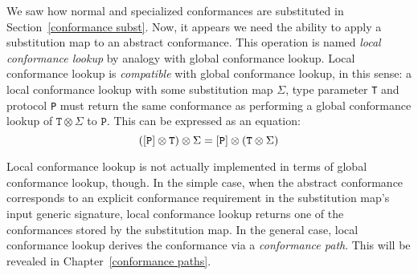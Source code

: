 \documentclass[../generics]{subfiles}
\begin{document}
We saw how normal and specialized conformances are substituted in Section~\ref{conformance subst}. Now, it appears we need the ability to apply a substitution map to an abstract conformance. This operation is named \emph{local conformance lookup} by analogy with global conformance lookup. Local conformance lookup is \emph{compatible} with global conformance lookup, in this sense: a local conformance lookup with some substitution map $\Sigma$, type parameter \texttt{T} and protocol \texttt{P} must return the same conformance as performing a global conformance lookup of $\texttt{T}\otimes\Sigma$ to $\texttt{P}$. This can be expressed as an equation:
\[([\texttt{P}]\otimes\texttt{T})\otimes\Sigma=[\texttt{P}]\otimes(\texttt{T}\otimes\Sigma)\]

Local conformance lookup is not actually implemented in terms of global conformance lookup, though. In the simple case, when the abstract conformance corresponds to an explicit conformance requirement in the substitution map's input generic signature,  local conformance lookup returns one of the conformances stored by the substitution map. In the general case, local conformance lookup derives the conformance via a \emph{conformance path}. This will be revealed in Chapter~\ref{conformance paths}.
\end{document}
